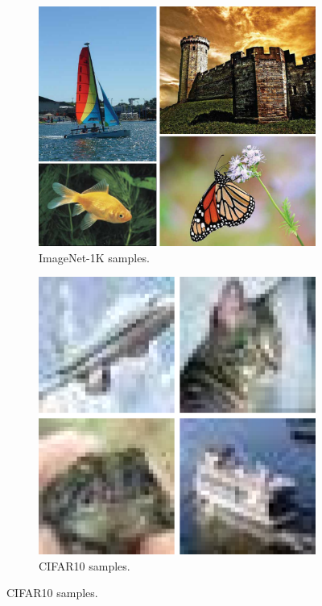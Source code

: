 \documentclass[../../book-main.tex]{subfiles}
\begin{document}
\begin{figure}
    \centering
    
    \hfill 
    \begin{subfigure}{0.3\textwidth}
        \centering 
        \includegraphics[width=\textwidth]{chapters/chapter7/figs/imagenet.pdf}
        \caption{\small ImageNet-1K samples.}
    \end{subfigure}
    \hfill 
    \begin{subfigure}{0.26\textwidth}
        \centering 
        \includegraphics[width=\textwidth]{chapters/chapter7/figs/cifar10.pdf}
        \caption{\small CIFAR10 samples.}
    \end{subfigure}
    \hfill 
    \phantom{}


\end{figure}
\end{document}
